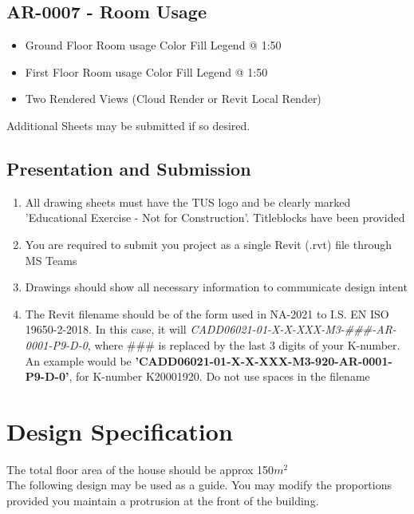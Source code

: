 \subsection*{AR-0007 - Room Usage}
\begin{itemize}
	\item Ground Floor Room usage Color Fill Legend @ 1:50
	\item First Floor Room usage Color Fill Legend @ 1:50
	\item Two Rendered Views (Cloud Render or Revit Local Render)
\end{itemize}


Additional Sheets may be submitted if so desired.

\newpage
\begin{flushleft}
\section*{Presentation and Submission}
\end{flushleft}


\begin{enumerate}
	\item All drawing sheets must have the TUS logo and be clearly marked 'Educational Exercise - Not for Construction'.  Titleblocks have been provided
	\item You are required to submit you project as a single Revit (.rvt) file through MS Teams
	\item Drawings should show all necessary information to communicate design intent
	\item The Revit filename should be of the form used in NA-2021 to I.S. EN ISO 19650-2-2018.  In this case, it will \textit{CADD06021-01-X-X-XXX-M3-\#\#\#-AR-0001-P9-D-0}, where \#\#\# is replaced by the last 3 digits of your K-number. An example would be \textbf{'CADD06021-01-X-X-XXX-M3-920-AR-0001-P9-D-0'}, for K-number K20001920.  Do not use spaces in the filename
\end{enumerate}


\newpage

\section*{Design Specification}



The total floor area of the house should be approx 150$m^2$\\

The following design may be used as a guide.  You may modify the proportions provided you maintain a protrusion at the front of the building.


